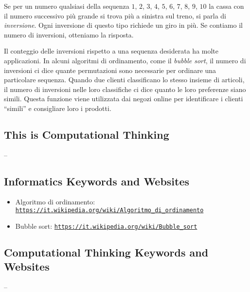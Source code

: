 \documentclass[a4paper,11pt]{report}
\newcommand{\BrochureUrlText}[1]{\texttt{#1}}
\begin{document}
Se per un numero qualsiasi della sequenza $1$, $2$, $3$, $4$, $5$, $6$, $7$, $8$, $9$, $10$ la cassa con il numero successivo più grande si trova più a sinistra sul treno, si parla di \emph{inversione}. Ogni inversione di questo tipo richiede un giro in più. Se contiamo il numero di inversioni, otteniamo la risposta.

Il conteggio delle inversioni rispetto a una sequenza desiderata ha molte applicazioni. In alcuni algoritmi di ordinamento, come il \emph{bubble sort}, il numero di inversioni ci dice quante permutazioni sono necessarie per ordinare una particolare sequenza. Quando due clienti classificano lo stesso insieme di articoli, il numero di inversioni nelle loro classifiche ci dice quanto le loro preferenze siano simili. Questa funzione viene utilizzata dai negozi online per identificare i clienti \enquote{simili} e consigliare loro i prodotti.


\subsection*{This is Computational Thinking}

–


\subsection*{Informatics Keywords and Websites}

\begin{itemize}
  \item Algoritmo di ordinamento: \href{https://it.wikipedia.org/wiki/Algoritmo_di_ordinamento}{\BrochureUrlText{https://it.wikipedia.org/wiki/Algoritmo\_di\_ordinamento}}
  \item Bubble sort: \href{https://it.wikipedia.org/wiki/Bubble_sort}{\BrochureUrlText{https://it.wikipedia.org/wiki/Bubble\_sort}}
\end{itemize}


\subsection*{Computational Thinking Keywords and Websites}

–
\end{document}

